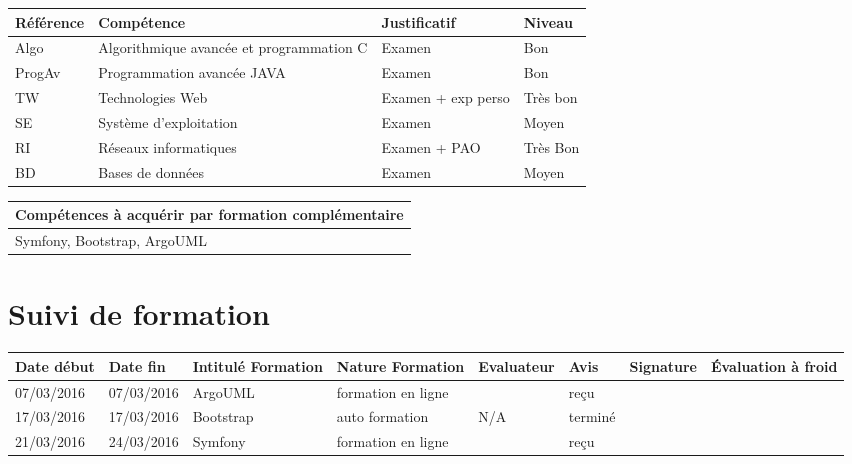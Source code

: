 \documentclass[11pt]{article}
\begin{document}
\begin{table}[!hp]
\centering
	\begin{tabularx}{\linewidth}{|X|X|X|X|}
	\hline
	\rowcolor{gray!40} Référence & Compétence & Justificatif & Niveau \\
	\hline
	 Algo & Algorithmique avancée et programmation C & Examen & Bon\\
	\hline
	 ProgAv & Programmation avancée JAVA & Examen & Bon\\
	\hline
	 TW & Technologies Web & Examen + exp perso & Très bon\\
	\hline
	 SE & Système d'exploitation & Examen & Moyen\\
	\hline
	 RI & Réseaux informatiques & Examen + PAO & Très Bon\\
	\hline
	 BD & Bases de données & Examen & Moyen \\
	\hline
	\end{tabularx}
\end{table}

\begin{table}[!hp]
\centering
	\begin{tabularx}{\linewidth}{|X|}
	\hline
	\rowcolor{gray!40} Compétences à acquérir par formation complémentaire \\
	\hline
	Symfony, Bootstrap, ArgoUML  \\
	\hline
	\end{tabularx}
\end{table}

\section*{\large Suivi de formation}

\centering
	\begin{longtable}{|p{}|p{}|p{}|p{}|p{}|p{}|p{}|p{}|}
	\hline
	\rowcolor{gray!40} \tiny Date début & \tiny Date fin & \tiny Intitulé Formation & \tiny Nature Formation & \tiny Evaluateur & \tiny Avis & \tiny Signature & \tiny Évaluation à froid \\
	\hline
	07/03/2016 &07/03/2016 &ArgoUML &formation en ligne &\Julie &reçu & &  \\
	\hline
	17/03/2016 &17/03/2016 & Bootstrap & auto formation & N/A & terminé & &  \\
	\hline
	21/03/2016 & 24/03/2016 & Symfony &formation en ligne & \Florian & reçu & &  \\
	\hline
	\end{longtable}
\end{document}
